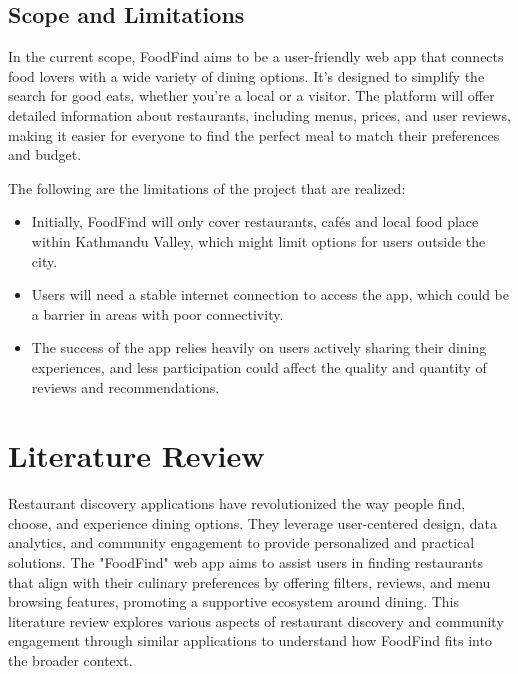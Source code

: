 \documentclass[12pt, a4paper, oneside]{article}
\begin{document}
\subsection{Scope and Limitations}
In the current scope, FoodFind aims to be a user-friendly web app that connects food lovers with a wide variety of dining options. It’s designed to simplify the search for good eats, whether you’re a local or a visitor. The platform will offer detailed information about restaurants, including menus, prices, and user reviews, making it easier for everyone to find the perfect meal to match their preferences and budget.

The following are the limitations of the project that are realized:
\begin{itemize}
 	\item  Initially, FoodFind will only cover restaurants, cafés and local food place within Kathmandu Valley, which might limit options for users outside the city.
	\item Users will need a stable internet connection to access the app, which could be a barrier in areas with poor connectivity.
    \item The success of the app relies heavily on users actively sharing their dining experiences, and less participation could affect the quality and quantity of reviews and recommendations.
 \end{itemize}
\break








\section{Literature Review}
Restaurant discovery applications have revolutionized the way people find, choose, and experience dining options. They leverage user-centered design, data analytics, and community engagement to provide personalized and practical solutions. The "FoodFind" web app aims to assist users in finding restaurants that align with their culinary preferences by offering filters, reviews, and menu browsing features, promoting a supportive ecosystem around dining. This literature review explores various aspects of restaurant discovery and community engagement through similar applications to understand how FoodFind fits into the broader context.
\end{document}
